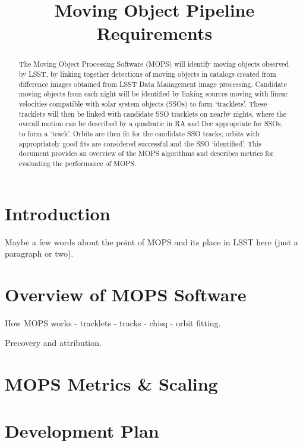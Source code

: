 \documentclass[12pt,preprint]{aastex}
\begin{document}
\title{Moving Object Pipeline Requirements}

\author{}

\begin{abstract}
The Moving Object Processing Software (MOPS) will identify moving
objects observed by LSST, by linking together detections of moving
objects in catalogs created from difference images obtained from LSST
Data Management image processing. Candidate moving objects from each
night will be identified by linking sources moving with linear
velocities compatible with solar system objects (SSOs) to form
`tracklets'. These tracklets will then be linked with candidate SSO
tracklets on nearby nights, where the overall motion can be described
by a quadratic in RA and Dec appropriate for SSOs, to form a
`track'.  Orbits are then fit for the candidate SSO tracks; orbits
with appropriately good fits are considered successful and the SSO
`identified'.  This document provides an overview of the MOPS
algorithms and describes metrics for evaluating the performance of
MOPS.
\end{abstract}

\tableofcontents


\section{Introduction}

Maybe a few words about the point of MOPS and its place in LSST here
(just a paragraph or two). 
 
\section{Overview of MOPS Software}


How MOPS works  - tracklets - tracks - chisq - orbit fitting. 

Precovery and attribution. 


\section{MOPS Metrics \& Scaling}


\section{Development Plan}





\end{document}
